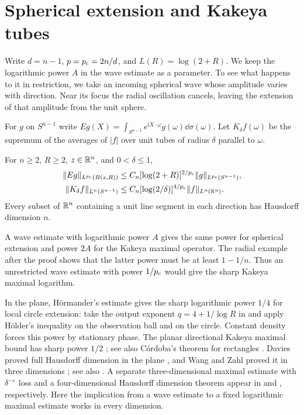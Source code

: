 \section{Spherical extension and Kakeya tubes}\label{sec:kakeya}

Write \(d=n-1\), \(p=p_{\mathrm c}=2n/d\), and \(L(R)=\log(2+R)\). We keep the
logarithmic power \(A\) in the wave estimate as a parameter. To see what
happens to it in restriction, we take an incoming spherical wave whose
amplitude varies with direction. Near its focus the radial oscillation
cancels, leaving the extension of that amplitude from the unit sphere.

For \(g\) on \(S^{n-1}\) write
\(Eg(X)=\int_{S^{n-1}}e^{\mathrm iX\cdot\omega}g(\omega)\dd\sigma(\omega)\).
Let \(K_\delta f(\omega)\) be the supremum of the averages of \(|f|\)
over unit tubes of radius \(\delta\) parallel to \(\omega\).

\begin{corollary}\label{cor:quant-kakeya}
For \(n\ge2\), \(R\ge2\), \(z\in\mathbb R^n\), and \(0<\delta\le1\),
\begin{align*}
 \|Eg\|_{L^{p_{\mathrm c}}(B(z,R))}
      &\le C_n [\log(2+R)]^{2/p_{\mathrm c}}\|g\|_{L^{p_{\mathrm c}}(S^{n-1})},\\
 \|K_\delta f\|_{L^n(S^{n-1})}
      &\le C_n [\log(2/\delta)]^{4/p_{\mathrm c}}\|f\|_{L^n(\mathbb R^n)}.
\end{align*}
Every subset of \(\mathbb R^n\) containing a unit line segment in each direction has Hausdorff dimension \(n\).
\end{corollary}

A wave estimate with logarithmic power \(A\) gives the same power for
spherical extension and power \(2A\) for the Kakeya maximal operator.
The radial example after the proof shows that the latter power must be
at least \(1-1/n\). Thus an unrestricted wave estimate with power
\(1/p_{\mathrm c}\) would give the sharp Kakeya maximal logarithm.

In the plane, H\"ormander's estimate gives the sharp logarithmic
power $1/4$ for local circle extension: take the output exponent
$q=4+1/\log R$ in \cite[Corollary~1.3]{Hormander1973FLp} and apply
H\"older's inequality on the observation ball and on the circle.
Constant density forces this power by stationary phase. The planar directional
Kakeya maximal bound has sharp power $1/2$
\cite[Equation~(1.5)]{Bourgain1991Kakeya}; see also C\'ordoba's
theorem for rectangles \cite{Cordoba1977}. Davies proved full
Hausdorff dimension in the plane \cite{Davies1971}, and Wang and
Zahl proved it in three dimensions \cite[Theorem~1.1]{WangZahl2025};
see also \cite{GuthWangZahl2026Kakeya}. A separate three-dimensional
maximal estimate with $\delta^{-\varepsilon}$ loss and a
four-dimensional Hausdorff dimension theorem appear in
\cite[Theorem~1.1]{OpenAI2026KakeyaThree} and
\cite[Theorem~1.1]{OpenAI2026Kakeya4Hausdorff}, respectively.
Here the implication from a wave estimate to a fixed logarithmic
maximal estimate works in every dimension.

